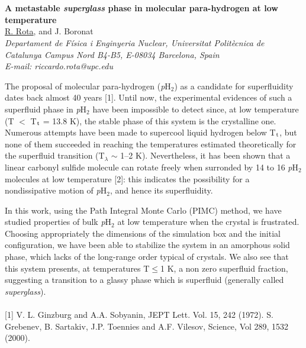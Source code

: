 \section*{}
\begin{center}
{\bf \Large
A metastable \textit{superglass} phase
in molecular para-hydrogen at low temperature
}
\\
\vspace{0.5cm}
\underline{R. Rota}, and J. Boronat
\\
\vspace{0.5cm}
{\it
Departament de Física i Enginyeria Nuclear, Universitat Politècnica de Catalunya
Campus Nord B4-B5, E-08034 Barcelona, Spain
}
\\
\vspace{0.5cm}
{\it E-mail: riccardo.rota@upc.edu}
\\
\vspace{0.5cm}
\end{center}
The proposal of molecular para-hydrogen (\textit{p}H$_{2}$) as a candidate for superfluidity dates back almost
40 years [1]. Until now, the experimental evidences of such a superfluid phase in \textit{p}H$_{2}$ have been
impossible to detect since, at low temperature (T $<$ T$_{\rm t}$ = 13.8 K), the stable phase of this system
is the crystalline one. Numerous attempts have been made to supercool liquid hydrogen below T$_{\rm t}$,
but none of them succeeded in reaching the temperatures estimated theoretically for the superfluid
transition (T$_{\lambda}$ $\sim$ 1--2 K). Nevertheless, it has been shown that a linear carbonyl sulfide molecule
can rotate freely when surronded by 14 to 16 \textit{p}H$_{2}$ molecules at low temperature [2]: this indicates
the possibility for a nondissipative motion of \textit{p}H$_{2}$, and hence its superfluidity.

In this work, using the Path Integral Monte Carlo (PIMC) method, we have studied properties of
bulk \textit{p}H$_{2}$ at low temperature when the crystal is frustrated. Choosing appropriately the dimensions
of the simulation box and the initial configuration, we have been able to stabilize the system in
an amorphous solid phase, which lacks of the long-range order typical of crystals. We also see
that this system presents, at temperatures T$\leq$1 K, a non zero superfluid fraction, suggesting a
transition to a glassy phase which is superfluid (generally called \textit{superglass}).
\\
\vspace{0.5cm}
\\
{\footnotesize
[1] V. L. Ginzburg and A.A. Sobyanin, JEPT Lett. Vol. 15, 242 (1972).
\newline
[2] S. Grebenev, B. Sartakiv, J.P. Toennies and A.F. Vilesov, Science, Vol 289, 1532 (2000).
\newline
}


